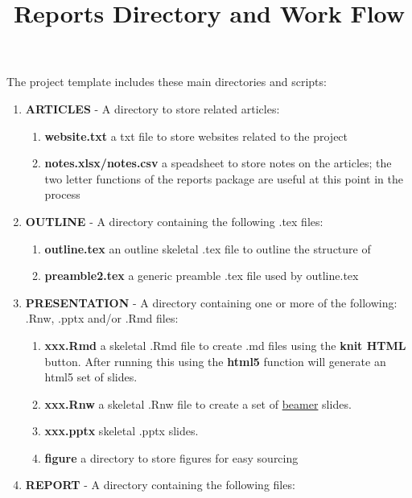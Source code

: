 \documentclass{article}\usepackage{graphicx, color}
\begin{document}
\title{Reports Directory and Work Flow}
\author{}
\date{}
\maketitle

\vspace{-1cm}
The project template includes these main directories and scripts:

\begin{enumerate}
  \item \textbf{ARTICLES} - A directory to store related articles:
  \begin{enumerate}
    \item \textbf{website.txt} a txt file to store websites related to the project
    \item \textbf{notes.xlsx/notes.csv} a speadsheet to store notes on the articles; the two letter functions of the reports package are useful at this point in the process
  \end{enumerate}
  \item \textbf{OUTLINE} - A directory containing the following .tex files:
  \begin{enumerate}
    \item \textbf{outline.tex} an outline skeletal .tex file to outline the structure of  
    \item \textbf{preamble2.tex} a generic preamble .tex file used by outline.tex  
  \end{enumerate}  
  \item \textbf{PRESENTATION} - A directory containing one or more of the following: .Rnw, .pptx and/or .Rmd files:
  \begin{enumerate}
    \item \textbf{xxx.Rmd} a skeletal .Rmd file to create .md files using the \textbf{knit HTML} button.  After running this using the \textbf{html5} function will generate an html5 set of slides.
    \item \textbf{xxx.Rnw} a skeletal .Rnw file to create a set of \href{http://www.math.umbc.edu/~rouben/beamer/}{beamer} slides.  
    \item \textbf{xxx.pptx}  skeletal .pptx slides.      
     \item \textbf{figure} a directory to store figures for easy sourcing
  \end{enumerate} 
  \item \textbf{REPORT} - A directory containing the following files:
  \begin{enumerate}

\end{enumerate}
\end{enumerate}
\end{document}
